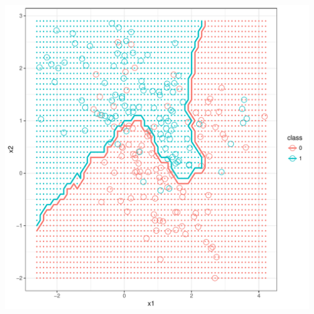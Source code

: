 \documentclass[12pt,oneside]{book}\usepackage[]{graphicx}\usepackage[]{color}
\makeatletter
\def\maxwidth{ %
  \ifdim\Gin@nat@width>\linewidth
    \linewidth
  \else
    \Gin@nat@width
  \fi
}
\newenvironment{knitrout}{}{} %
\makeatother
\begin{document}
{\begin{knitrout}
\includegraphics[width=\maxwidth]{figure/unnamed-chunk-240-1} 


\end{knitrout}}
\end{document}
